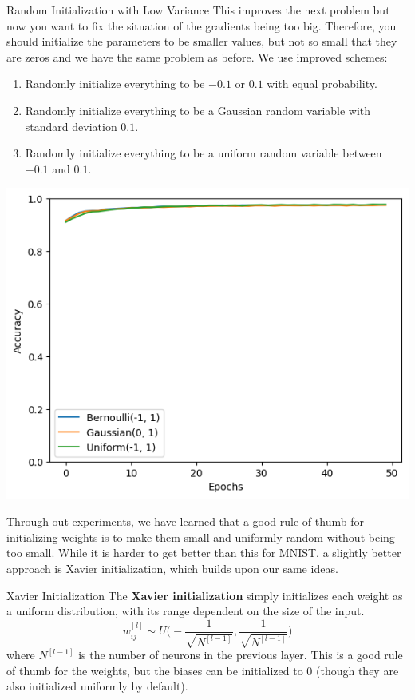 \documentclass{article}
\begin{document}
    \begin{example}{Random Initialization with Low Variance}
      This improves the next problem but now you want to fix the situation of the gradients being too big. Therefore, you should initialize the parameters to be smaller values, but not so small that they are zeros and we have the same problem as before. We use improved schemes: 
      \begin{enumerate}[itemsep=0mm] 
        \item Randomly initialize everything to be $-0.1$ or $0.1$ with equal probability. 
        \item Randomly initialize everything to be a Gaussian random variable with standard deviation $0.1$. 
        \item Randomly initialize everything to be a uniform random variable between $-0.1$ and $0.1$.
      \end{enumerate}
      \begin{center}
        \includegraphics[scale=0.5]{img/01_MLP/third_initialize.png}
      \end{center}
    \end{example}

    Through out experiments, we have learned that a good rule of thumb for initializing weights is to make them small and uniformly random without being too small. While it is harder to get better than this for MNIST, a slightly better approach is Xavier initialization, which builds upon our same ideas. 

    \begin{definition}{Xavier Initialization}
      The \textbf{Xavier initialization} simply initializes each weight as a uniform distribution, with its range dependent on the size of the input. 
        \[w_{ij}^{[l]} \sim U \bigg( -\frac{1}{\sqrt{N^{[l-1]}}}, \frac{1}{\sqrt{N^{[l-1]}}} \bigg)\]
      where $N^{[l-1]}$ is the number of neurons in the previous layer. This is a good rule of thumb for the weights, but the biases can be initialized to $0$ (though they are also initialized uniformly by default).
    \end{definition}
\end{document}

